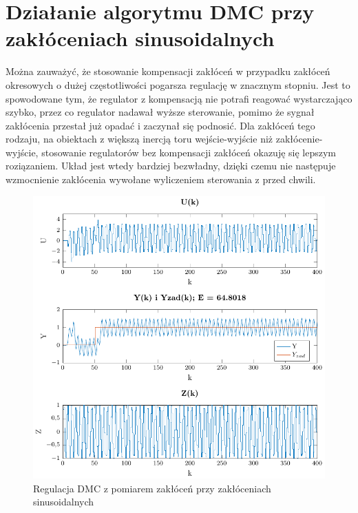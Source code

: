 \documentclass[a4paper,titlepage,11pt,twosides,floatssmall]{mwrep}
\begin{document}
\section{Działanie algorytmu DMC przy zakłóceniach sinusoidalnych}
Można zauważyć, że stosowanie kompensacji zakłóceń w przypadku zakłóceń okresowych o dużej częstotliwości pogarsza regulację w znacznym stopniu. Jest to spowodowane tym, że regulator z kompensacją nie potrafi reagować wystarczająco szybko, przez co regulator nadawał wyższe sterowanie, pomimo że sygnał zakłócenia przestał już opadać i zaczynał się podnosić. Dla zakłóceń tego rodzaju, na obiektach z większą inercją toru wejście-wyjście niż zakłócenie-wyjście, stosowanie regulatorów bez kompensacji zakłóceń okazuję się lepszym roziązaniem. Układ jest wtedy bardziej bezwładny, dzięki czemu nie następuje wzmocnienie zakłócenia wywołane wyliczeniem sterowania z przed chwili. 

\begin{figure}[H]
	\centering
	\includegraphics[scale=0.85]{../../Lab2/PDF_rysunki/Z6_DMCSinZOdsprz.pdf}
	\caption{Regulacja DMC z pomiarem zakłóceń przy zakłóceniach sinusoidalnych}
	\label{sin_z_pom}
\end{figure}
\end{document}
